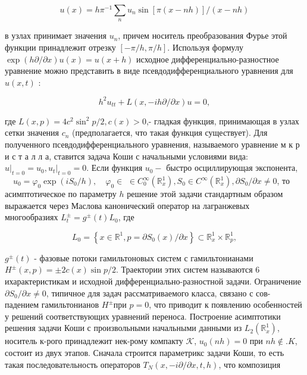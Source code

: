 \documentclass[10pt]{article}
\begin{document}
\[

u(x)=h \pi^{-1} \sum_{n} u_{n} \sin [\pi(x-n h)] /(x-n h)

\]



в узлах принимает значения $u_{n}$, причем носитель преобразования Фурье этой функции принадлежит отрезку $[-\pi / h, \pi / h]$. Используя формулу $\exp (h \partial / \partial x) u(x)=u(x+h)$ исходное дифференциально-разностное уравнение можно представить в виде псевдодифференциального уравнения для $u(x, t)$ :



\[

h^{2} u_{t t}+L(x,-i h \partial / \partial x) u=0,

\]



где $L(x, p)=4 c^{2} \sin ^{2} p / 2, c(x)>0$,- гладкая функция, принимающая в узлах сетки значения $c_{n}$ (предполагается, что такая функция существует). Для полученного псевдодифференциального уравнения, называемого уравнение м к р и с т а л л а, ставится задача Коши с начальными условиями вида: $\left.u\right|_{t=0}=u_{0},\left.u_{t}\right|_{t=0}=0$. Если функция $u_{0}-$ быстро осциллирующая экспонента, $\quad u_{0}=\varphi_{0} \exp \left(i S_{0} / h\right), \quad \varphi_{0} \in$ $\in C_{0}^{\infty}\left(\mathbb{R}_{x}^{1}\right), S_{0} \in C^{\infty}\left(\mathbb{R}_{x}^{1}\right), \partial S_{0} / \partial x \neq 0$, то асимптотическое по параметру $h$ решение этой задачи стандартным образом выражается через Маслова канонический оператор на лагранжевых многообразиях $L_{t}^{ \pm}=g^{ \pm}(t) L_{0}$, где



\[

L_{0}=\left\{x \in \mathbb{R}^{1}, p=\partial S_{0}(x) / \partial x\right\} \subset \mathbb{R}_{x}^{1} \times \mathbb{R}_{p}^{1},

\]



$g^{ \pm}(t)$ - фазовые потоки гамильтоновых систем с гамильтонианами $H^{ \pm}(x, p)= \pm 2 c(x) \sin p / 2$. Траектории этих систем называются 6 ихарактеристикам и исходной дифференциально-разностной задачи. Ограничение $\partial S_{0} / \partial x \neq 0$, типичное для задач рассматриваемого класса, связано с сов- падением гамильтонианов $H^{ \pm}$при $p=0$, что приводит к появлению особенностей у решений соответствующих уравнений переноса. Построение асимптотики решения задачи Коши с произвольными начальными данными из $L_{2}\left(\mathbb{R}_{x}^{1}\right)$, носитель к-рого принадлежит нек-рому компакту $\mathscr{K}$, $u_{0}(n h)=0$ при $n h \notin . K$, состоит из двух этапов. Сначала строится параметрикс задачи Коши, то есть такая последовательность операторов $T_{N}(x,-i \partial / \partial x, t, h)$, что композиция
\end{document}
